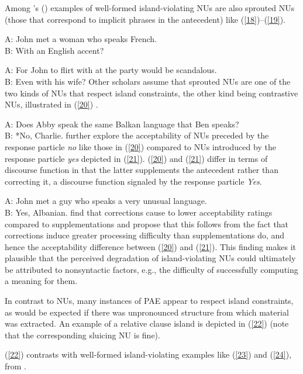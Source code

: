 \documentclass[output=paper
	        ,collection
	        ,collectionchapter
 	        ,biblatex
                ,babelshorthands
                ,newtxmath
                ,draftmode
                ,colorlinks, citecolor=brown
]{langscibook}
\begin{document}
{Among \citeauthor{CJ2005a}'s (\citeyear[245]{CJ2005a}) examples of well-formed island-violating NUs are also sprouted NUs (those that correspond to implicit phrases in the antecedent) like (\ref{18})--(\ref{19}).

\ea A: John met a woman who speaks French.\\B: With an English accent?\label{18}\z

\ea A: For John to flirt with at the party would be scandalous. \\B: Even with his wife?\label{19}\z
Other scholars assume that sprouted NUs are one of the two kinds of NUs that respect island constraints, the other kind being contrastive NUs, illustrated in (\ref{20}) \citep{Chung1995, Merchant2001, Griffiths2014}.

\ea A: Does Abby speak the same Balkan language that Ben speaks?\\
B: *No, Charlie. \citep{Merchant2001}  \label{20}\z
%
\citet{Schmeh2015} further explore the acceptability of NUs preceded by the response particle \textit{no} like those in (\ref{20}) compared to NUs introduced by the response particle \textit{yes} depicted in (\ref{21}). (\ref{20}) and (\ref{21}) differ in terms of discourse function in that the latter supplements the antecedent rather than correcting it, a discourse function signaled by the response particle \textit{Yes}.

\ea A: John met a guy who speaks a very unusual language. \\B: Yes, Albanian. \citep[245]{CJ2005a} \label{21}\z
%
\citet{Schmeh2015} find that corrections cause to
lower acceptability ratings compared to supplementations and propose that this follows from the fact that corrections induce greater processing difficulty than supplementations do, and hence the acceptability difference between (\ref{20}) and (\ref{21}). This finding makes it plausible that the perceived degradation of island-violating NUs could ultimately be attributed to nonsyntactic factors, e.g., the difficulty of successfully computing a meaning for them.

In contrast to NUs, many instances of PAE appear to respect island constraints, as would be expected if there was unpronounced structure from which material was extracted. An example of a relative clause island is depicted in (\ref{22}) (note that the corresponding sluicing NU is fine).


\z
(\ref{22}) contrasts with well-formed island-violating examples like (\ref{23}) and (\ref{24}), from \citet{Ginzburg2018}.


}
\end{document}
